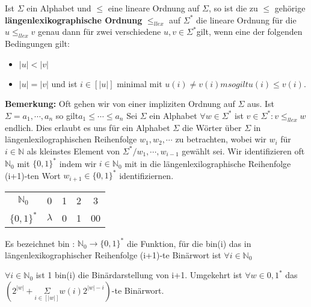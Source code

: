     Ist \(\Sigma\) ein Alphabet und \(\leq\)  eine lineare Ordnung auf \(\Sigma\), so ist die zu \(\leq\)  gehörige \textbf{längenlexikographische Ordnung} \(\leq_{llex}\) auf \(\Sigma^{*}\) die lineare Ordnung für die \(u \leq_{llex} v\) genau dann für zwei verschiedene \(u, v\in \Sigma^{*} \)gilt, wenn eine der folgenden Bedingungen gilt:
\begin{itemize}
    \item \(\lvert u \rvert < \lvert v \rvert\)
    \item \(\lvert u \rvert = \lvert v \rvert\) und ist \(i \in [|u|]\) minimal mit 
    \(u(i) \neq v(i)m so gilt u(i) \leq v(i)\).
\end{itemize}
\textbf{Bemerkung: }Oft gehen wir von einer impliziten Ordnung auf \(\Sigma\) aus. Ist \(\Sigma = {a_{1}, \cdots, a_{n}}\) so gilt\( a_{1}\leq \cdots \leq a_{n}
\)
    Sei \(\Sigma\) ein Alphabet \(\forall w \in \Sigma^{*}\) ist \({v\in \Sigma^{*} : v \leq_{llex}w}\) endlich. Dies erlaubt es uns für ein Alphabet \(\Sigma\) die Wörter über \(\Sigma\) in längenlexilographischen Reihenfolge \(w_{1}, w_{2}, \cdots\) zu betrachten, wobei wir \(w_{i}\) für \(i \in \mathbb{N}\) als kleinstes Element von \(\Sigma^{*}/{w_{1},\cdots, w_{i-1}}\) gewählt sei. Wir identifizieren oft \(\mathbb{N}_{0}\) mit \(\{0, 1\}^{*}\) indem wir \(i \in \mathbb{N}_{0}\) mit in die längenlexilographische Reihenfolge (i+1)-ten Wort \( w_{i+1} \in \{0,1\}^{*}\) identifiziernen.
    \begin{center}
        \begin{tabular}{ c c c c c }
            \(\mathbb{N}_{0}\) & 0 & 1 & 2 & 3\\ 
            \(\{0, 1\}^{*}\) & \(\lambda\) & 0 & 1 & 00\\
        \end{tabular}
    \end{center}

    Es bezeichnet bin : \(\mathbb{N}_{0} \rightarrow \{0, 1\}^{*}\) die Funktion, für die bin(i) das in längenlexikographischer Reihenfolge (i+1)-te Binärwort ist \(\forall i \in \mathbb{N}_{0}\)

    \(\forall i \in \mathbb{N}_{0}\) ist 1 bin(i) die Binärdarstellung von i+1. Umgekehrt ist \(\forall w \in {0, 1}^{*}\) das \((2^{|w|} + \underset{i \in [|w|]}{\Sigma} w(i) 2^{|w|-i})\)-te Binärwort.

